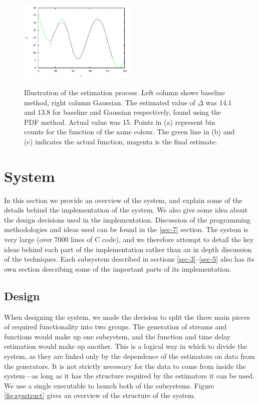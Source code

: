 \documentclass[a4paper,11pt,twoside]{article}
\begin{document}
\begin{figure}[h!]
{   \includegraphics[width=0.5\textwidth]{images/gausscomb}
   }
   \caption{Illustration of the estimation process. Left column shows baseline
   method, right column Gaussian. The estimated value of $\Delta$ was 14.1 and
   13.8 for baseline and Gaussian respectively, found using the PDF
   method. Actual value was 15.  Points in (a) represent bin counts for the
   function of the same colour. The green line in (b) and (c) indicates the actual function,
   magenta is the final estimate.}
   \label{fig:finest}
   \end{figure}
\section{System}
\label{sec-6}

  In this section we provide an overview of the system, and explain some of the
  details behind the implementation of the system. We also give some idea about
  the design decisions used in the implementation. Discussion of the programming
  methodologies and ideas used can be found in the \ref{sec-7} section. The
  system is very large (over 7000 lines of C code), and we therefore attempt to
  detail the key ideas behind each part of the implementation rather than an in
  depth discussion of the techniques. Each subsystem described in sections
  \ref{sec-3}--\ref{sec-5} also has its own section
  describing some of the important parts of its implementation.
\subsection{Design}
\label{sec-6-1}

   When designing the system, we made the decision to split the three main
   pieces of required functionality into two groups. The generation of streams
   and functions would make up one subsystem, and the function and time delay
   estimation would make up another. This is a logical way in which to divide
   the system, as they are linked only by the dependence of the estimators on
   data from the generators. It is not strictly necessary for the data to come
   from inside the system---as long as it has the structure required by the
   estimators it can be used. We use a single executable to launch both of the
   subsystems. Figure \ref{fig:sysstruct} gives an overview of the structure of
   the system.
\end{document}

